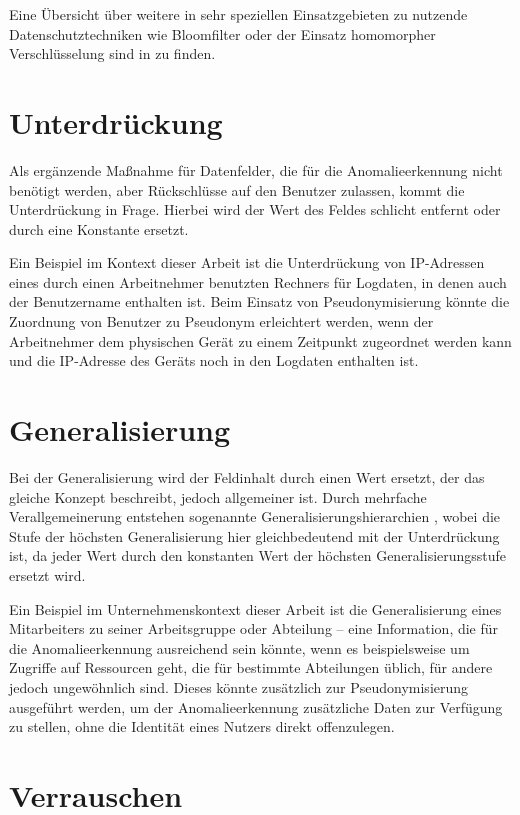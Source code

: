 Eine Übersicht über weitere in sehr speziellen Einsatzgebieten zu nutzende Datenschutztechniken wie Bloomfilter oder der Einsatz homomorpher Verschlüsselung sind in \cite{niksefat2017privacy} zu finden.

\section{Unterdrückung} %

Als ergänzende Maßnahme für Datenfelder, die für die Anomalieerkennung nicht benötigt werden, aber Rückschlüsse auf den Benutzer zulassen, kommt die Unterdrückung in Frage. Hierbei wird der Wert des Feldes schlicht entfernt oder durch eine Konstante ersetzt. 

Ein Beispiel im Kontext dieser Arbeit ist die Unterdrückung von IP-Adressen eines durch einen Arbeitnehmer benutzten Rechners für Logdaten, in denen auch der Benutzername enthalten ist. Beim Einsatz von Pseudonymisierung könnte die Zuordnung von Benutzer zu Pseudonym erleichtert werden, wenn der Arbeitnehmer dem physischen Gerät zu einem Zeitpunkt zugeordnet werden kann und die IP-Adresse des Geräts noch in den Logdaten enthalten ist.

\section{Generalisierung}

Bei der Generalisierung wird der Feldinhalt durch einen Wert ersetzt, der das gleiche Konzept beschreibt, jedoch allgemeiner ist. Durch mehrfache Verallgemeinerung entstehen sogenannte Generalisierungshierarchien , wobei die Stufe der höchsten Generalisierung hier gleichbedeutend mit der Unterdrückung ist, da jeder Wert durch den konstanten Wert der höchsten Generalisierungsstufe ersetzt wird.

Ein Beispiel im Unternehmenskontext dieser Arbeit ist die Generalisierung eines Mitarbeiters zu seiner Arbeitsgruppe oder Abteilung -- eine Information, die für die Anomalieerkennung ausreichend sein könnte, wenn es beispielsweise um Zugriffe auf Ressourcen geht, die für bestimmte Abteilungen üblich, für andere jedoch ungewöhnlich sind. Dieses könnte zusätzlich zur Pseudonymisierung ausgeführt werden, um der Anomalieerkennung zusätzliche Daten zur Verfügung zu stellen, ohne die Identität eines Nutzers direkt offenzulegen.

\section{Verrauschen} %

